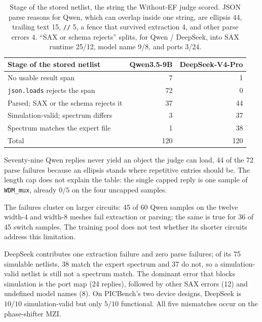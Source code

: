\documentclass[11pt]{article}
\begin{document}
\begin{table}[H]
\caption{Stage of the stored netlist, the string the Without-EF judge scored.
JSON parse reasons for Qwen, which can overlap inside one string, are ellipsis 44, trailing text 15, \texttt{//} 5, a fence that survived extraction 4, and other parse errors 4.
``SAX or schema rejects'' splits, for Qwen / DeepSeek, into SAX runtime 25/12, model name 9/8, and ports 3/24.}
\label{tab:loci}
\begin{center}
\begin{small}
\begin{tabular}{lrr}
\toprule
Stage of the stored netlist & Qwen3.5-9B & DeepSeek-V4-Pro \\
\midrule
No usable result span & 7 & 1 \\
\texttt{json.loads} rejects the span & 72 & 0 \\
Parsed; SAX or the schema rejects it & 37 & 44 \\
Simulation-valid; spectrum differs & 3 & 37 \\
Spectrum matches the expert file & 1 & 38 \\
\midrule
Total & 120 & 120 \\
\bottomrule
\end{tabular}
\end{small}
\end{center}
\end{table}

Seventy-nine Qwen replies never yield an object the judge can load, 44 of the 72 parse failures because an ellipsis stands where repetitive entries should be.
The length cap does not explain the table: the single capped reply is one sample of \texttt{WDM\_mux}, already $0/5$ on the four uncapped samples.

The failures cluster on larger circuits: 45 of 60 Qwen samples on the twelve width-$4$ and width-$8$ meshes fail extraction or parsing; the same is true for 36 of 45 switch samples. The training pool does not test whether its shorter circuits address this limitation.

DeepSeek contributes one extraction failure and zero parse failures; of its 75 simulable netlists, 38 match the expert spectrum and 37 do not, so a simulation-valid netlist is still not a spectrum match.
The dominant error that blocks simulation is the port map (24 replies), followed by other SAX errors (12) and undefined model names (8).
On PICBench's two device designs, DeepSeek is $10/10$ simulation-valid but only $5/10$ functional. All five mismatches occur on the phase-shifter MZI.
\end{document}
